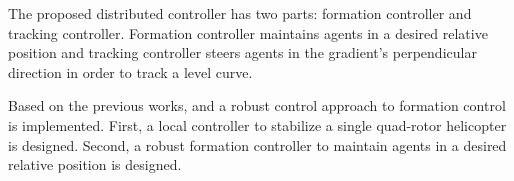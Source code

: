 
The proposed distributed controller has two parts: formation controller and tracking controller. Formation controller maintains agents in a desired relative position and tracking controller steers  agents in the gradient's perpendicular direction in order to track a level curve.

Based on the previous works, \citep{PilzPopovWerner09} and \citep{PopovWerner09} a robust control approach to formation control is implemented. First, a local controller to stabilize a single quad-rotor helicopter is designed. Second, a robust formation controller to maintain agents in a desired relative position is designed.


